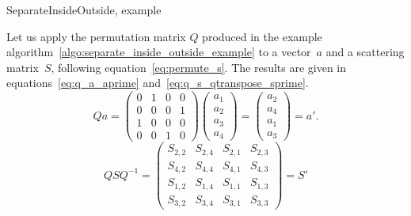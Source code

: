 \begin{algorithm}[H]
    \caption{SeparateInsideOutside, example}
    \label{algo:separate_inside_outside_example}
    \begin{algorithmic}
         
    \end{algorithmic}
\end{algorithm}
Let us apply the permutation matrix $Q$ produced in the example algorithm~\ref{algo:separate_inside_outside_example} to a vector~$a$ and a scattering matrix~$S$, following equation~\eqref{eq:permute_s}.
The results are given in equations~\eqref{eq:q_a_aprime} and~\eqref{eq:q_s_qtranspose_sprime}.
\begin{equation}
    Q a
    =
    \begin{pmatrix}
        0 & 1 & 0 & 0\\
        0 & 0 & 0 & 1\\
        1 & 0 & 0 & 0\\
        0 & 0 & 1 & 0
    \end{pmatrix}
    \begin{pmatrix}
        a_1 \\ a_2 \\ a_3 \\ a_4
    \end{pmatrix}
    =
    \begin{pmatrix}
        a_2 \\ a_4 \\ a_1 \\ a_3
    \end{pmatrix}
    =
    a'\text{.}
    \label{eq:q_a_aprime}
\end{equation}
\begin{equation}
    Q S Q^{-1}
    =
    \begin{pmatrix}
        S_{2,2} & S_{2,4} & S_{2,1} & S_{2,3} \\
        S_{4,2} & S_{4,4} & S_{4,1} & S_{4,3} \\
        S_{1,2} & S_{1,4} & S_{1,1} & S_{1,3} \\
        S_{3,2} & S_{3,4} & S_{3,1} & S_{3,3}
    \end{pmatrix}
    =
    S'
    \label{eq:q_s_qtranspose_sprime}
\end{equation}
